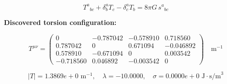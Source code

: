 
\begin{equation}
  T^a{}_{bc} + \delta^a_b T_c - \delta^a_c T_b = 8\pi G \, s^a{}_{bc}
\end{equation}

\textbf{Discovered torsion configuration:}

\begin{equation}
  T^{\mu\nu} = \begin{pmatrix}
    0 & -0.787042 & -0.578910 & 0.718560 \\
    0.787042 & 0 & 0.671094 & -0.046892 \\
    0.578910 & -0.671094 & 0 & 0.003542 \\
    -0.718560 & 0.046892 & -0.003542 & 0
  \end{pmatrix} \quad \text{m}^{-1}
\end{equation}

\begin{equation}
  |T| = 1.3869e+0 \text{ m}^{-1}, \quad
  \lambda = -10.0000, \quad
  \sigma = 0.0000e+0 \text{ J}\cdot\text{s/m}^3
\end{equation}